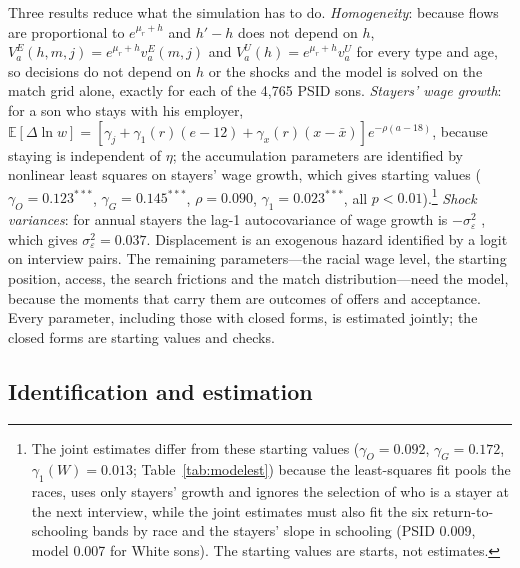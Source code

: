 Three results reduce what the simulation has to do. \textit{Homogeneity}: because flows are proportional to $e^{\mu_r +
h}$ and $h' - h$ does not depend on $h$, $V^E_a(h, m, j) = e^{\mu_r + h} v^E_a(m, j)$ and $V^U_a(h) = e^{\mu_r + h}
v^U_a$ for every type and age, so decisions do not depend on $h$ or the shocks and the model is solved on the match grid
alone, exactly for each of the 4,765 PSID sons. \textit{Stayers' wage growth}: for a son who stays with his employer,
$\mathbb E[\Delta \ln w] = [\gamma_j + \gamma_1(r)(e - 12) + \gamma_x(r)(x - \bar x)] e^{-\rho(a-18)}$, because staying
is independent of $\eta$; the accumulation parameters are identified by nonlinear least squares on stayers' wage
growth, which gives starting values ($\gamma_O = 0.123^{***}$, $\gamma_G = 0.145^{***}$, $\rho = 0.090$, $\gamma_1 =
0.023^{***}$, all $p < 0.01$).\footnote{The joint estimates differ from these starting values ($\gamma_O = 0.092$,
$\gamma_G = 0.172$, $\gamma_1(W) = 0.013$; Table~\ref{tab:modelest}) because the least-squares fit pools the races,
uses only stayers' growth and ignores the selection of who is a stayer at the next interview, while the joint estimates
must also fit the six return-to-schooling bands by race and the stayers' slope in schooling (PSID 0.009, model 0.007
for White sons). The starting values are starts, not estimates.} \textit{Shock variances}: for annual stayers the lag-1 autocovariance of wage growth is
$-\sigma_\varepsilon^2$ \citep{altonji2013modeling}, which gives $\sigma_\varepsilon^2 = 0.037$. Displacement is an
exogenous hazard identified by a logit on interview pairs. The remaining parameters---the racial wage level, the
starting position, access, the search frictions and the match distribution---need the model, because the moments that
carry them are outcomes of offers and acceptance. Every parameter, including those with closed forms, is estimated
jointly; the closed forms are starting values and checks.

\subsection{Identification and estimation}

